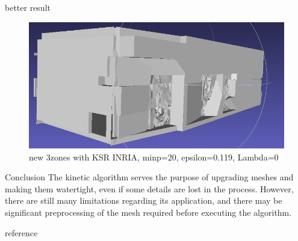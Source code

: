 \documentclass[10pt]{beamer}
\begin{document}
\begin{frame}{better result }
\begin{figure}[H]
\begin{minipage}[t]{0.40\textwidth}
        \end{minipage}
        \begin{minipage}[t]{0.43\textwidth}
            \includegraphics[width=\textwidth]{../../images/screen_kinetic/3zones_v2_1.png}
          \end{minipage}
          \caption{new 3zones with KSR INRIA, minp=20, epsilon=0.119, Lambda=0 }
      \end{figure}  
\end{frame}


\begin{frame}{Conclusion}
    The kinetic algorithm serves the purpose of upgrading meshes and making them watertight,
    even if some details are lost in the process. However, there are still many limitations regarding its application, and there may be significant preprocessing of the mesh required before executing the algorithm.
\end{frame}


\begin{frame}[allowframebreaks]{reference}
    \nocite{*}
    
    
\end{frame}
\end{document}

